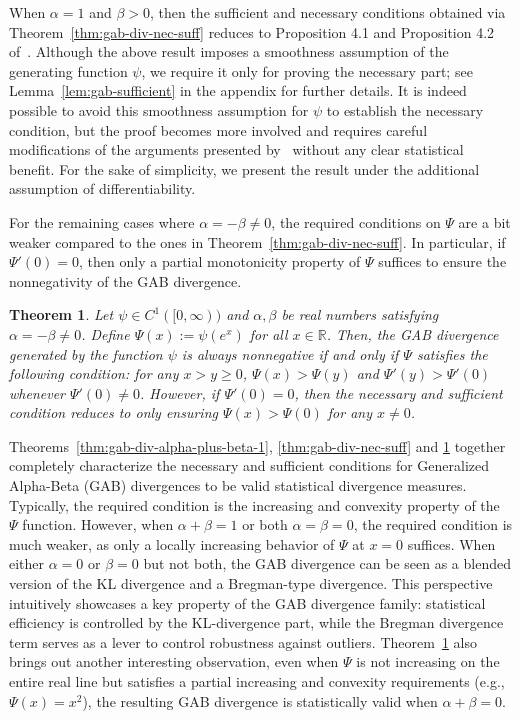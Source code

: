 \documentclass[11pt]{article}
\theoremstyle{plain}
\newtheorem{theorem}{Theorem}[section]
\theoremstyle{remark}
\def\R{\mathbb{R}}
\begin{document}
When $\alpha = 1$ and $\beta > 0$, then the sufficient and necessary conditions obtained via Theorem~\ref{thm:gab-div-nec-suff} reduces to Proposition 4.1 and Proposition 4.2 of~\cite{ray2023functional}. Although the above result imposes a smoothness assumption of the generating function $\psi$, we require it only for proving the necessary part; see Lemma~\ref{lem:gab-sufficient} in the appendix for further details. It is indeed possible to avoid this smoothness assumption for $\psi$ to establish the necessary condition, but the proof becomes more involved and requires careful modifications of the arguments presented by~\cite{ray2023functional} without any clear statistical benefit. For the sake of simplicity, we present the result under the additional assumption of differentiability.

For the remaining cases where $\alpha = -\beta \neq 0$, the required conditions on $\Psi$ are a bit weaker compared to the ones in Theorem~\ref{thm:gab-div-nec-suff}. In particular, if $\Psi'(0) = 0$, then only a partial monotonicity property of $\Psi$ suffices to ensure the nonnegativity of the GAB divergence.


\begin{theorem}\label{thm:gab-div-nec-suff-case4}
    Let $\psi \in C^1([0, \infty))$ and $\alpha, \beta$ be real numbers satisfying $\alpha = -\beta \neq 0$. Define $\Psi(x) := \psi(e^x)$ for all $x \in \R$. Then, the GAB divergence generated by the function $\psi$ is always nonnegative if and only if $\Psi$ satisfies the following condition: for any $x > y \geq 0$, $\Psi(x) > \Psi(y)$ and $\Psi'(y) > \Psi'(0)$ whenever $\Psi'(0) \neq 0$. However, if $\Psi'(0) = 0$, then the necessary and sufficient condition reduces to only ensuring $\Psi(x) > \Psi(0)$ for any $x \neq 0$.
\end{theorem}

Theorems~\ref{thm:gab-div-alpha-plus-beta-1}, \ref{thm:gab-div-nec-suff} and \ref{thm:gab-div-nec-suff-case4} together completely characterize the necessary and sufficient conditions for Generalized Alpha-Beta (GAB) divergences to be valid statistical divergence measures. Typically, the required condition is the increasing and convexity property of the $\Psi$ function. However, when $\alpha + \beta = 1$ or both $\alpha = \beta = 0$, the required condition is much weaker, as only a locally increasing behavior of $\Psi$ at $x = 0$ suffices. When either $\alpha = 0$ or $\beta = 0$ but not both, the GAB divergence can be seen as a blended version of the KL divergence and a Bregman-type divergence. This perspective intuitively showcases a key property of the GAB divergence family: statistical efficiency is controlled by the KL-divergence part, while the Bregman divergence term serves as a lever to control robustness against outliers. Theorem~\ref{thm:gab-div-nec-suff-case4} also brings out another interesting observation, even when $\Psi$ is not increasing on the entire real line but satisfies a partial increasing and convexity requirements (e.g., $\Psi(x) = x^2$), the resulting GAB divergence is statistically valid when $\alpha + \beta = 0$.
\end{document}
